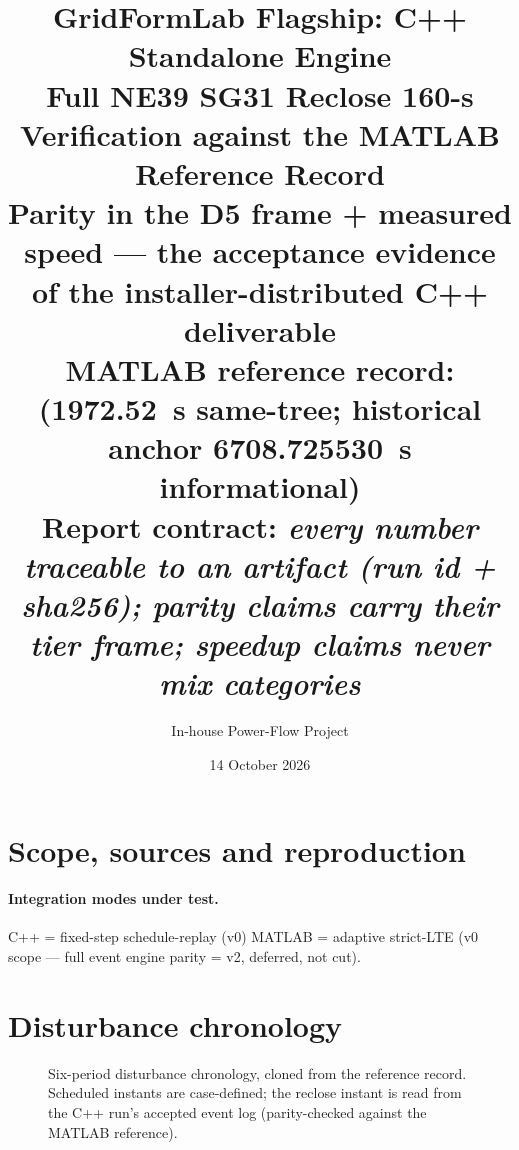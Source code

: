 \documentclass[12pt,a4paper]{article}
\title{\textbf{GridFormLab Flagship: C++ Standalone Engine}\\[1mm]
\large Full NE39 SG31 Reclose 160-s Verification against the MATLAB
Reference Record\\[0.5mm]
\normalsize Parity in the D5 frame + measured speed --- the acceptance
evidence of the installer-distributed C++ deliverable\\[2mm]
\normalsize MATLAB reference record: \code{report\_port\_engine\_en.pdf}
(1972.52~s same-tree; historical anchor 6708.725530~s informational)\\[1mm]
\normalsize Report contract: \emph{every number traceable to an artifact
(run id + sha256); parity claims carry their tier frame; speedup claims
never mix categories}}
\author{In-house Power-Flow Project}
\date{14 October 2026}
\newcommand{\intmodes}{C++ = fixed-step schedule-replay (v0) \textbar{}
  MATLAB = adaptive strict-LTE}
\newcommand{\vscopecite}{(v0 scope --- full event engine parity = v2,
  deferred, not cut)}
\begin{document}
\maketitle

\begin{abstract}

\end{abstract}

\newpage
\tableofcontents
\newpage

\section{Scope, sources and reproduction}\label{sec:scope}


\paragraph{Integration modes under test.}
\intmodes{} \vscopecite.


\section{Disturbance chronology}\label{sec:chrono}
\begin{figure}[H]
\centering

\caption{Six-period disturbance chronology, cloned from the reference
record.  Scheduled instants are case-defined; the reclose instant is read
from the C++ run's accepted event log (parity-checked against the MATLAB
reference).}
\label{fig:periods}
\end{figure}
\end{document}
